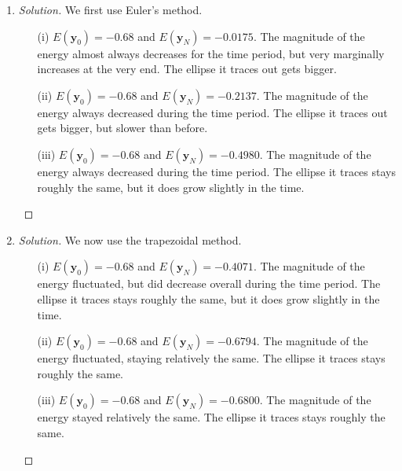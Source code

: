 \documentclass{article}
\begin{document}
\begin{enumerate}
	\item \begin{proof}[Solution]\let\qed\relax
		We first use Euler's method.
		\begin{enumerate}
			\item[(i)] $E(\mathbf{y}_0) = -0.68$ and
				$E(\mathbf{y}_N) = -0.0175$.
				The magnitude of the energy almost always decreases
				for the time period,
				but very marginally increases at the very end.
				The ellipse it traces out gets bigger.
			\item[(ii)] $E(\mathbf{y}_0) = -0.68$ and
				$E(\mathbf{y}_N) = -0.2137$.
				The magnitude of the energy always decreased
				during the time period.
				The ellipse it traces out gets bigger, but slower than before.
			\item[(iii)] $E(\mathbf{y}_0) = -0.68$ and
				$E(\mathbf{y}_N) = -0.4980$.
				The magnitude of the energy always decreased
				during the time period.
				The ellipse it traces stays roughly the same,
				but it does grow slightly in the time.
		\end{enumerate}
	\end{proof}
	\item \begin{proof}[Solution]\let\qed\relax
		We now use the trapezoidal method.
		\begin{enumerate}
			\item[(i)] $E(\mathbf{y}_0) = -0.68$ and
				$E(\mathbf{y}_N) = -0.4071$.
				The magnitude of the energy fluctuated,
				but did decrease overall during the time period.
				The ellipse it traces stays roughly the same,
				but it does grow slightly in the time.
			\item[(ii)] $E(\mathbf{y}_0) = -0.68$ and
				$E(\mathbf{y}_N) = -0.6794$.
				The magnitude of the energy fluctuated, staying relatively the same.
				The ellipse it traces stays roughly the same.
			\item[(iii)] $E(\mathbf{y}_0) = -0.68$ and
				$E(\mathbf{y}_N) = -0.6800$.
				The magnitude of the energy stayed relatively the same.
				The ellipse it traces stays roughly the same.
		\end{enumerate}
	\end{proof}
\end{enumerate}
\end{document}
